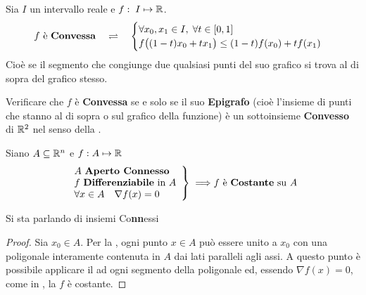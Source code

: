 \begin{definition}
	Sia $I$ un intervallo reale e $f:\; I \mapsto \mathbb{R}$.
	\begin{equation*}
		f \text{ è \textbf{Convessa}}
		\quad \rightleftharpoons \quad
		\begin{cases}
			\forall x_0, x_1 \in I,\; \forall t \in \left[0,1\right]\\
			f \bigl( (1-t)x_0 + t x_1 \bigr) \leq (1-t) f(x_0) + t f(x_1)
		\end{cases}
	\end{equation*}
	Cioè se il segmento che congiunge due qualsiasi punti del suo grafico si trova al di sopra del grafico stesso.
\end{definition}
\begin{exercise}
	Verificare che $f$ è \textbf{Convessa} se e solo se il suo \textbf{Epigrafo} (cioè l'insieme di punti che stanno al di sopra o sul grafico della funzione)
	è un sottoinsieme \textbf{Convesso} di $\mathbb{R}^2$ nel senso della .
\end{exercise}
\begin{proposition}
	Siano $A \subseteq \mathbb{R}^n$ e $f: A \mapsto \mathbb{R}$
	\[
		\left.
			\begin{array}{l}
				A \text{ \textbf{Aperto Connesso}}\\
				f \text{ \textbf{Differenziabile} in } A\\
				\forall x \in A \quad \nabla f(x) = 0
			\end{array}
		\right\}
		\implies\\
		f \text{ è \textbf{Costante} su } A
	\]
	\vspace*{-\baselineskip}
	\begin{note}
		Si sta parlando di insiemi Co\textbf{nn}essi
	\end{note}
	\begin{proof}
		Sia $x_0 \in A$. Per la , ogni punto $x \in A$ può essere unito a $x_0$ con una poligonale interamente contenuta in $A$ dai lati paralleli agli assi. A questo punto è possibile applicare il  ad ogni segmento della poligonale ed, essendo $\nabla f(x) = 0$, come in , la $f$ è costante.
	\end{proof}
\end{proposition}

\newpage
